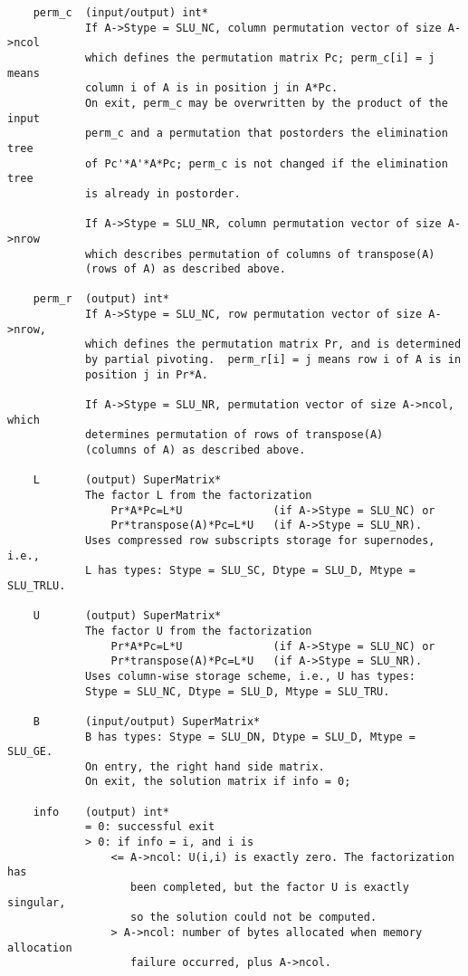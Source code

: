 \begin{verbatim}
    perm_c  (input/output) int*
            If A->Stype = SLU_NC, column permutation vector of size A->ncol
            which defines the permutation matrix Pc; perm_c[i] = j means 
            column i of A is in position j in A*Pc.
            On exit, perm_c may be overwritten by the product of the input
            perm_c and a permutation that postorders the elimination tree
            of Pc'*A'*A*Pc; perm_c is not changed if the elimination tree
            is already in postorder.
   
            If A->Stype = SLU_NR, column permutation vector of size A->nrow
            which describes permutation of columns of transpose(A) 
            (rows of A) as described above.
    
    perm_r  (output) int*
            If A->Stype = SLU_NC, row permutation vector of size A->nrow, 
            which defines the permutation matrix Pr, and is determined 
            by partial pivoting.  perm_r[i] = j means row i of A is in 
            position j in Pr*A.
   
            If A->Stype = SLU_NR, permutation vector of size A->ncol, which
            determines permutation of rows of transpose(A)
            (columns of A) as described above.
   
    L       (output) SuperMatrix*
            The factor L from the factorization 
                Pr*A*Pc=L*U              (if A->Stype = SLU_NC) or
                Pr*transpose(A)*Pc=L*U   (if A->Stype = SLU_NR).
            Uses compressed row subscripts storage for supernodes, i.e.,
            L has types: Stype = SLU_SC, Dtype = SLU_D, Mtype = SLU_TRLU.
            
    U       (output) SuperMatrix*
            The factor U from the factorization 
                Pr*A*Pc=L*U              (if A->Stype = SLU_NC) or
                Pr*transpose(A)*Pc=L*U   (if A->Stype = SLU_NR).
            Uses column-wise storage scheme, i.e., U has types:
            Stype = SLU_NC, Dtype = SLU_D, Mtype = SLU_TRU.
   
    B       (input/output) SuperMatrix*
            B has types: Stype = SLU_DN, Dtype = SLU_D, Mtype = SLU_GE.
            On entry, the right hand side matrix.
            On exit, the solution matrix if info = 0;
   
    info    (output) int*
            = 0: successful exit
            > 0: if info = i, and i is
                <= A->ncol: U(i,i) is exactly zero. The factorization has
                   been completed, but the factor U is exactly singular,
                   so the solution could not be computed.
                > A->ncol: number of bytes allocated when memory allocation
                   failure occurred, plus A->ncol.

\end{verbatim}

